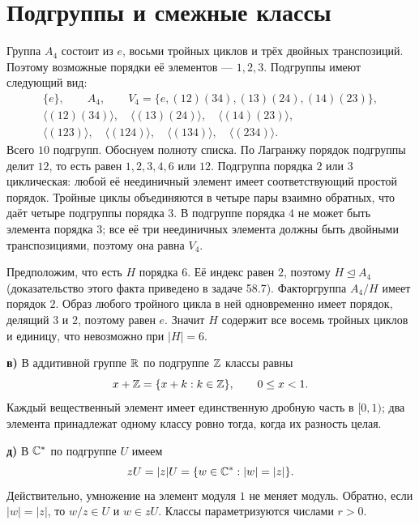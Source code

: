 \section{Подгруппы и смежные классы}

Группа $A_4$ состоит из $e$, восьми тройных циклов и трёх
двойных транспозиций. Поэтому возможные порядки её элементов --- $1,2,3$.
Подгруппы имеют следующий вид:
\[
\begin{gathered}
\{e\},\qquad A_4,\qquad
V_4=\{e,(12)(34),(13)(24),(14)(23)\},\\
\langle(12)(34)\rangle,\quad
\langle(13)(24)\rangle,\quad
\langle(14)(23)\rangle,\\
\langle(123)\rangle,\quad\langle(124)\rangle,\quad
\langle(134)\rangle,\quad\langle(234)\rangle.
\end{gathered}
\]
Всего $10$ подгрупп. Обоснуем полноту списка.
По Лагранжу порядок подгруппы делит $12$, то есть равен
$1,2,3,4,6$ или $12$. Подгруппа порядка $2$ или $3$ циклическая:
любой её неединичный элемент имеет соответствующий простой порядок.
Тройные циклы объединяются в четыре пары взаимно обратных,
что даёт четыре подгруппы порядка $3$.
В подгруппе порядка $4$ не может быть элемента порядка $3$;
все её три неединичных элемента должны быть двойными транспозициями,
поэтому она равна $V_4$.

Предположим, что есть $H$ порядка $6$. Её индекс равен $2$,
поэтому $H\trianglelefteq A_4$ (доказательство этого факта приведено
в задаче 58.7). Факторгруппа $A_4/H$ имеет порядок $2$.
Образ любого тройного цикла в ней одновременно имеет порядок,
делящий $3$ и $2$, поэтому равен $e$.
Значит $H$ содержит все восемь тройных циклов и единицу,
что невозможно при $|H|=6$.

\textbf{в)} В аддитивной группе $\mathbb{R}$ по подгруппе $\mathbb{Z}$ классы равны
\[x+\mathbb{Z}=\{x+k:k\in\mathbb{Z}\},\qquad 0\le x<1.\]
Каждый вещественный элемент имеет единственную дробную часть
в $[0,1)$; два элемента принадлежат одному классу ровно тогда,
когда их разность целая.

\textbf{д)} В $\mathbb{C}^*$ по подгруппе $U$ имеем
\[zU=|z|U=\{w\in\mathbb{C}^*:|w|=|z|\}.\]
Действительно, умножение на элемент модуля $1$ не меняет модуль.
Обратно, если $|w|=|z|$, то $w/z\in U$ и $w\in zU$.
Классы параметризуются числами $r>0$.

